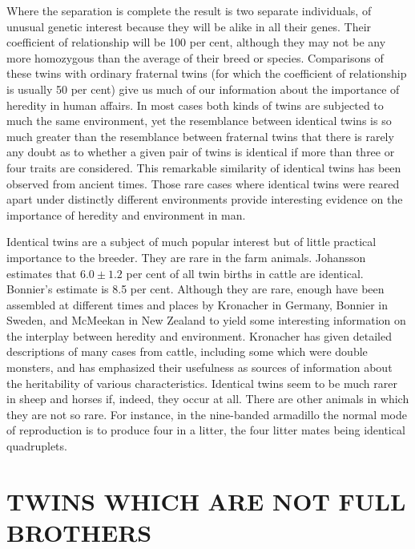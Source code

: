 Where the separation is complete the result is two separate individuals,
of unusual genetic interest because they will be alike in all their
genes. Their coefficient of relationship will be 100 per cent, although
they may not be any more homozygous than the average of their breed
or species. Comparisons of these twins with ordinary fraternal twins
(for which the coefficient of relationship is usually 50 per cent) give us
much of our information about the importance of heredity in human
affairs. In most cases both kinds of twins are subjected to much the same
environment, yet the resemblance between identical twins is so much
greater than the resemblance between fraternal twins that there is rarely
any doubt as to whether a given pair of twins is identical if more
than three or four traits are considered. This remarkable similarity of
identical twins has been observed from ancient times. Those rare cases
where identical twins were reared apart under distinctly different environments
provide interesting evidence on the importance of heredity
and environment in man.

Identical twins are a subject of much popular interest but of little
practical importance to the breeder. They are rare in the farm animals.
Johansson estimates that $6.0 \pm 1.2$ per cent of all twin births in cattle
are identical. Bonnier's estimate is 8.5 per cent. Although they are
rare, enough have been assembled at different times and places by
Kronacher in Germany, Bonnier in Sweden, and McMeekan in New
Zealand to yield some interesting information on the interplay between
heredity and environment. Kronacher has given detailed descriptions
of many cases from cattle, including some which were double monsters,
and has emphasized their usefulness as sources of information about the
heritability of various characteristics. Identical twins seem to be much
rarer in sheep and horses if, indeed, they occur at all. There are other
animals in which they are not so rare. For instance, in the nine-banded
armadillo the normal mode of reproduction is to produce four in a
litter, the four litter mates being identical quadruplets.

\section*{TWINS WHICH ARE NOT FULL BROTHERS}

